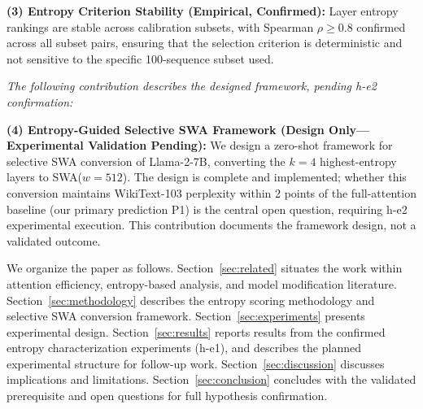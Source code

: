 \textbf{(3) Entropy Criterion Stability (Empirical, Confirmed):} Layer entropy rankings are stable across calibration subsets, with Spearman $\rho \geq 0.8$ confirmed across all subset pairs, ensuring that the selection criterion is deterministic and not sensitive to the specific 100-sequence subset used.

\noindent\textit{The following contribution describes the designed framework, pending h-e2 confirmation:}

\textbf{(4) Entropy-Guided Selective SWA Framework (Design Only---Experimental Validation Pending):} We design a zero-shot framework for selective SWA conversion of Llama-2-7B, converting the $k = 4$ highest-entropy layers to SWA($w = 512$). The design is complete and implemented; whether this conversion maintains WikiText-103 perplexity within 2 points of the full-attention baseline (our primary prediction P1) is the central open question, requiring h-e2 experimental execution. This contribution documents the framework design, not a validated outcome.

We organize the paper as follows. Section~\ref{sec:related} situates the work within attention efficiency, entropy-based analysis, and model modification literature. Section~\ref{sec:methodology} describes the entropy scoring methodology and selective SWA conversion framework. Section~\ref{sec:experiments} presents experimental design. Section~\ref{sec:results} reports results from the confirmed entropy characterization experiments (h-e1), and describes the planned experimental structure for follow-up work. Section~\ref{sec:discussion} discusses implications and limitations. Section~\ref{sec:conclusion} concludes with the validated prerequisite and open questions for full hypothesis confirmation.
